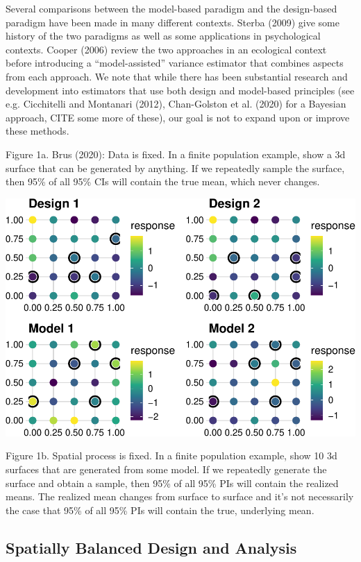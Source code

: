 \documentclass[]{elsarticle} %
\begin{document}
Several comparisons between the model-based paradigm and the
design-based paradigm have been made in many different contexts. Sterba
(2009) give some history of the two paradigms as well as some
applications in psychological contexts. Cooper (2006) review the two
approaches in an ecological context before introducing a
``model-assisted'' variance estimator that combines aspects from each
approach. We note that while there has been substantial research and
development into estimators that use both design and model-based
principles (see e.g. Cicchitelli and Montanari (2012), Chan-Golston et
al. (2020) for a Bayesian approach, CITE some more of these), our goal
is not to expand upon or improve these methods.

Figure 1a. Brus (2020): Data is fixed. In a finite population example,
show a 3d surface that can be generated by anything. If we repeatedly
sample the surface, then 95\% of all 95\% CIs will contain the true
mean, which never changes.

\includegraphics[width=1\linewidth]{SpatialDVM_Manuscript_files/figure-latex/unnamed-chunk-1-1}

Figure 1b. Spatial process is fixed. In a finite population example,
show 10 3d surfaces that are generated from some model. If we repeatedly
generate the surface and obtain a sample, then 95\% of all 95\% PIs will
contain the realized means. The realized mean changes from surface to
surface and it's not necessarily the case that 95\% of all 95\% PIs will
contain the true, underlying mean.

\hypertarget{spatially-balanced-design-and-analysis}{%
\subsection{Spatially Balanced Design and
Analysis}\label{spatially-balanced-design-and-analysis}}
\end{document}
